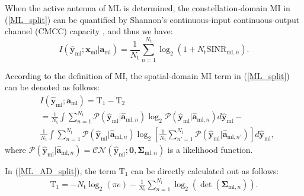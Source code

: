 \documentclass[journal]{IEEEtran}
\begin{document}
\begin{IEEEproof}
When the active antenna of ML is determined, the constellation-domain MI in (\ref{ML_split}) can be quantified by Shannon's continuous-input continuous-output channel (CMCC) capacity \cite{yang2008information}, and thus we have:
\begin{equation}
I(\hat{\mathbf{y}}_{\text{ml}};\mathbf{x}_{\text{ml}}|\mathbf{a}_\text{ml}) = \frac{1}{N_\text{t}} \sum_{n=1}^{N_\text{t}} \log_2(1+N_\text{t}\text{SINR}_{\text{ml},n}).
\label{CMCC}
\end{equation}

According to the definition of MI, the spatial-domain MI term in (\ref{ML_split}) can be denoted as follows:
\begin{equation}
\begin{split}
&I(\hat{\mathbf{y}}_{\text{ml}};\mathbf{a}_\text{ml}) = \text{T}_1 - \text{T}_2  \\
&=\frac{1}{N_\text{t}} \int \sum_{n=1}^{N_\text{t}} \mathcal{P} (\hat{\mathbf{y}}_{\text{ml}}|\hat{\mathbf{a}}_{\text{ml},n}) \log_2 \mathcal{P} (\hat{\mathbf{y}}_{\text{ml}}|\hat{\mathbf{a}}_{\text{ml},n}) d\hat{\mathbf{y}}_{\text{ml}} - \\
&\frac{1}{N_\text{t}} \int \sum_{n=1}^{N_\text{t}} \mathcal{P} (\hat{\mathbf{y}}_{\text{ml}}|\hat{\mathbf{a}}_{\text{ml},n}) \log_2 \left[\frac{1}{N_\text{t}} \sum_{n'=1}^{N_\text{t}} \mathcal{P} (\hat{\mathbf{y}}_{\text{ml}}|\hat{\mathbf{a}}_{\text{ml},n'})\right] d\hat{\mathbf{y}}_{\text{ml}},
\label{ML_AD_split}
\end{split}
\end{equation}
where $\mathcal{P} (\hat{\mathbf{y}}_{\text{ml}}|\hat{\mathbf{a}}_{\text{ml},n}) = \mathcal{CN}(\hat{\mathbf{y}}_{\text{ml}} ; \mathbf{0}, \mathbf{\Sigma}_{\text{ml},n})$ is a likelihood function.

In (\ref{ML_AD_split}), the term $\text{T}_1$ can be directly calculated out as follows:
\begin{equation}
\begin{array}{ll}
\text{T}_1 = -N_\text{t}\log_2(\pi e) -  \frac{1}{N_\text{t}}\sum_{n=1}^{N_\text{t}} \log_2(\det(\mathbf{\Sigma}_{\text{ml},n})).
\label{T1}
\end{array}
\end{equation}


\end{IEEEproof}
\end{document}
